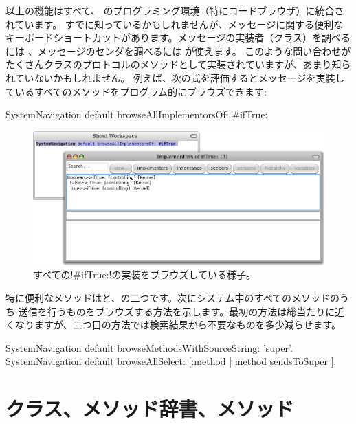 \documentclass[a4paper,10pt,twoside]{book}
\begin{document}
以上の機能はすべて、 \pharo のプログラミング環境（特にコードブラウザ）に統合されています。
すでに知っているかもしれませんが、メッセージに関する便利なキーボードショートカットがあります。メッセージの実装者（クラス）を調べるには  、メッセージのセンダを調べるには  が使えます。
このような問い合わせがたくさんクラスのプロトコルのメソッドとして実装されていますが、あまり知られていないかもしれません。
例えば、次の式を評価するとメッセージを実装しているすべてのメソッドをプログラム的にブラウズできます:
\begin{code}{}
SystemNavigation default browseAllImplementorsOf: #ifTrue:
\end{code}

\begin{figure}[ht]\centering
	\includegraphics[width=\linewidth]{implementors}
	\caption{すべての\ct!\#ifTrue:!の実装をブラウズしている様子。}
\end{figure}

特に便利なメソッドはと、の二つです。次にシステム中のすべてのメソッドのうち \super 送信を行うものをブラウズする方法を示します。最初の方法は総当たりに近くなりますが、二つ目の方法では検索結果から不要なものを多少減らせます。

\begin{code}{}
SystemNavigation default browseMethodsWithSourceString: 'super'.
SystemNavigation default browseAllSelect: [:method | method sendsToSuper ].
\end{code}

\section{クラス、メソッド辞書、メソッド}
\end{document}
